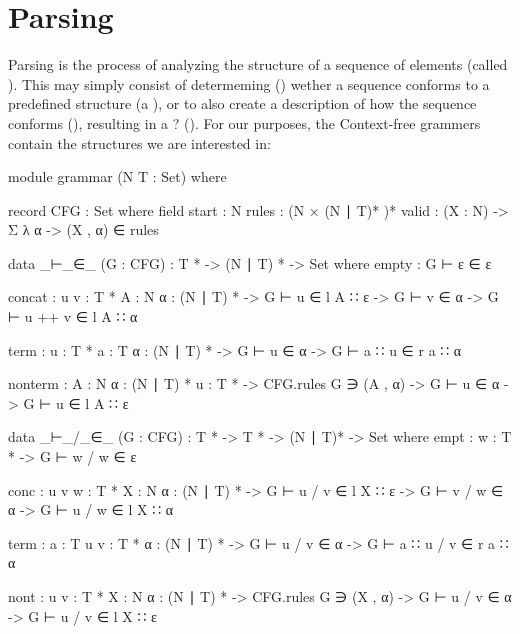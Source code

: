 \chapter{Parsing}

	Parsing is the process of analyzing the structure of a sequence of elements
	(called ). This may simply consist of determeming
	() wether a sequence conforms to a predefined structure
	(a ), or to also create a description of how the sequence
	conforms (), resulting in a ? ().  For
	our purposes, the Context-free grammers contain the structures we are
	interested in:
	
	\begin{code}

		module grammar (N T : Set) where

		record CFG : Set where
		  field
		    start : N
		    rules : (N × (N ∣ T)* )*
    		valid : (X : N) -> Σ λ α -> (X , α) ∈ rules

	\end{code}

	
	\begin{code}
	
		data _⊢_∈_ (G : CFG) :  T * -> (N ∣ T) * -> Set where
		  empty :
		    G ⊢ ε ∈ ε
		
		  concat : {u v : T *} {A : N} {α : (N ∣ T) *} ->
		    G ⊢ u ∈ l A ∷ ε -> G ⊢ v ∈ α -> G ⊢ u ++ v ∈ l A ∷ α
		
		  term : {u : T *} {a : T} {α : (N ∣ T) *} ->
		    G ⊢ u ∈ α -> G ⊢ a ∷ u ∈ r a ∷ α
		
		  nonterm : {A : N} {α : (N ∣ T) *} {u : T *} ->
		    CFG.rules G ∋ (A , α) -> G ⊢ u ∈ α -> G ⊢ u ∈ l A ∷ ε

	\end{code}

	\begin{code}
	
		data _⊢_/_∈_ (G : CFG) : T * -> T * -> (N ∣ T)* -> Set where
		  empt : {w : T *} ->
		    G ⊢ w / w ∈ ε
		
		  conc : {u v w : T *} {X : N} {α : (N ∣ T) *} ->
		    G ⊢ u / v ∈ l X ∷ ε ->
		    G ⊢ v / w ∈ α ->
		      G ⊢ u / w ∈ l X ∷ α
		
		  term : {a : T} {u v : T *} {α : (N ∣ T) *} ->
		    G ⊢ u / v ∈ α ->
		      G ⊢ a ∷ u / v ∈ r a ∷ α
		
		  nont : {u v : T *} {X : N} {α : (N ∣ T) *} ->
		    CFG.rules G ∋ (X , α) ->
		    G ⊢ u / v ∈ α ->
		    G ⊢ u / v ∈ l X ∷ ε

	\end{code}

